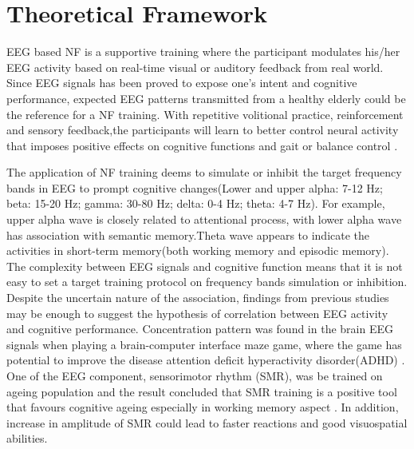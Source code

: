 \documentclass{article}
\begin{document}
\section{Theoretical Framework}
\begin{comment}
To describe the theoretical framework for the study.
•	A clear explanation of the proposed approach and why it is suitable to address the gaps outlined in the BACKGROUND section. 
•	Briefly outline a system of concepts, from published literature, that frames your study.
•	Can be presented either visually or textually. 
\end{comment}
EEG based NF is a supportive training where the participant modulates his/her EEG activity based on real-time visual or auditory feedback from real world. Since EEG signals has been proved to expose one's intent and cognitive performance, expected EEG patterns transmitted from a healthy elderly could be the reference for a NF training. With repetitive volitional practice, reinforcement and sensory feedback,the participants will learn to better control neural activity that imposes positive effects on cognitive functions and gait or balance control \cite{Miladinovic_2020}. 

The application of NF training deems to simulate or inhibit the target frequency bands in EEG to prompt cognitive changes(Lower and upper alpha: 7-12 Hz; beta: 15-20 Hz; gamma: 30-80 Hz; delta: 0-4 Hz; theta: 4-7 Hz). For example, upper alpha wave is closely related to attentional process, with lower alpha wave has association with semantic memory.Theta wave appears to indicate the activities in short-term memory(both working memory and episodic memory)\cite{Lecomte_2011}. The complexity between EEG signals and cognitive function means that it is not easy to set a target training protocol on frequency bands simulation or inhibition. Despite the uncertain nature of the association, findings from previous studies may be enough to suggest the hypothesis of correlation between EEG activity and cognitive performance. Concentration pattern was found in the brain EEG signals when playing a brain-computer interface maze game, where the game has potential to improve the disease attention deficit hyperactivity disorder(ADHD) \cite{Asheri_2018}. One of the EEG component, sensorimotor rhythm (SMR), was be trained on ageing population and the result concluded that SMR training is a positive tool that favours cognitive ageing especially in working memory aspect \cite{Campos_da_Paz_2018}. In addition, increase in amplitude of SMR could lead to faster reactions and good visuospatial abilities\cite{Doppelmayr_2011}. 
\end{document}
